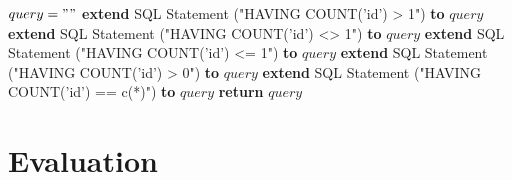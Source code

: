 \documentclass[oneside]{book}
\begin{document}
\begin{algorithm}
\label{array-sum5}
\begin{algorithmic}[1]
	\State $query = ""$
	 \State \textbf{extend} SQL Statement ("HAVING COUNT('id') > 1") \textbf{to} $query$
		\State \textbf{extend} SQL Statement ("HAVING COUNT('id') <> 1") \textbf{to} $query$
		\State \textbf{extend} SQL Statement ("HAVING COUNT('id') <= 1") \textbf{to} $query$
		\State \textbf{extend} SQL Statement ("HAVING COUNT('id') > 0") \textbf{to} $query$
		\State \textbf{extend} SQL Statement ("HAVING COUNT('id') == c(*)") \textbf{to} $query$
	\EndIf
	\State \textbf{return} $query$
\EndFunction
\end{algorithmic}
\end{algorithm}

\newpage

\section{Evaluation}
\label{sec:evaluation}
\end{document}
